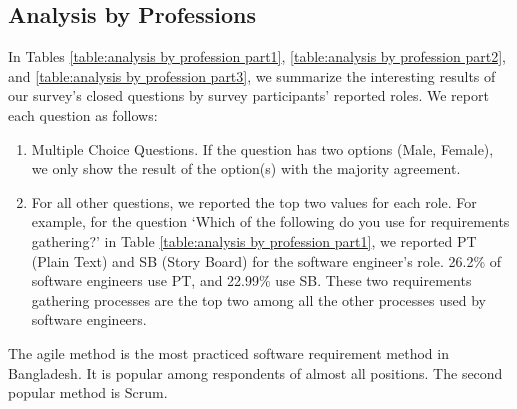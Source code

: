 \subsection{Analysis by Professions}
\label{analyze_by_professions}
In Tables \ref{table:analysis by profession part1}, \ref{table:analysis by profession part2}, and \ref{table:analysis by profession part3}, we summarize the interesting results of our survey's closed questions by survey participants' reported roles. We report each question as follows:

\begin{enumerate}[label=\arabic*)]
  \item Multiple Choice Questions. If the question has two options (Male, Female), we only show the result of the option(s) with the majority agreement.
  \item For all other questions, we reported the top two values for each role. For example, for the question ‘Which of the following do you use for requirements gathering?’ in Table \ref{table:analysis by profession part1}, we reported PT (Plain Text) and SB (Story Board) for the software engineer's role. 26.2\% of software engineers use PT, and 22.99\% use SB. These two requirements gathering processes are the top two among all the other processes used by software engineers.
\end{enumerate}







The agile method is the most practiced software requirement method in Bangladesh. It is popular among respondents of almost all positions. The second popular method is Scrum.

